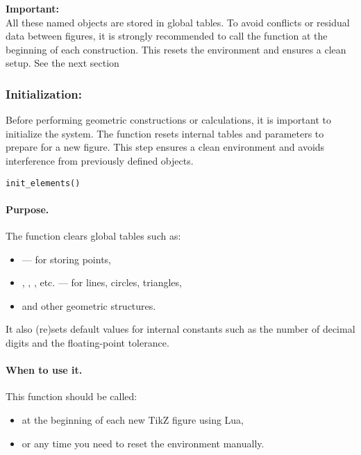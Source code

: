 \vspace{1em}
\tkzRHand{} \textbf{Important:} \\
All these named objects are stored in global tables. To avoid conflicts or residual data between figures, it is strongly recommended to call the function  at the beginning of each construction. This resets the environment and ensures a clean setup. See the next section


\subsubsection{Initialization: } %
\label{ssub:init_elements}

Before performing geometric constructions or calculations, it is important to initialize the system. The function  resets internal tables and parameters to prepare for a new figure. This step ensures a clean environment and avoids interference from previously defined objects.

\begin{mybox}
\begin{verbatim}
init_elements()
\end{verbatim}
\end{mybox}

\paragraph{Purpose.}
The function  clears global tables such as:
\begin{itemize}
  \item {} — for storing points,
  \item {}, , , etc. — for lines, circles, triangles,
  \item and other geometric structures.
\end{itemize}
It also (re)sets default values for internal constants such as the number of decimal digits and the floating-point tolerance.

\paragraph{When to use it.}
This function should be called:
\begin{itemize}
  \item at the beginning of each new TikZ figure using Lua,
  \item or any time you need to reset the environment manually.
\end{itemize}

